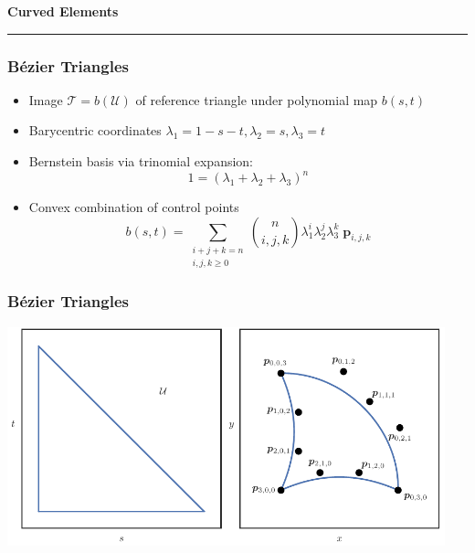 \documentclass{beamer}
\newcommand{\utri}{\mathcal{U}}
\begin{document}

\begin{frame}
\centering
{\Large \bf Curved Elements}
\rule{0.82\textwidth}{1pt}
\end{frame}

\begin{frame}
\frametitle{B\'{e}zier Triangles}
\begin{itemize}
\item Image \(\mathcal{T} = b\left(\utri\right)\) of reference triangle
  under polynomial map \(b(s, t)\)
\pause
\item Barycentric
  coordinates \(\lambda_1 = 1 - s - t, \lambda_2 = s, \lambda_3 = t\)
\pause
\item Bernstein basis via trinomial expansion:
\begin{equation*}
1 = \left(\lambda_1 + \lambda_2 + \lambda_3\right)^n
\end{equation*}
\pause
\vspace*{-0.9cm}
\item Convex combination of control points
\begin{equation*}
b(s, t) = \sum_{\substack{i + j + k = n \\ i, j, k \geq 0}}
  \binom{n}{i, j, k} \lambda_1^i \lambda_2^j \lambda_3^k \;
  \bm{p}_{i, j, k}
\end{equation*}
\end{itemize}
\end{frame}

\begin{frame}
\frametitle{B\'{e}zier Triangles}
\begin{center}
\includegraphics[width=0.95\textwidth]
                {../images/slides/main_figure31.pdf}
\end{center}
\end{frame}
\end{document}
